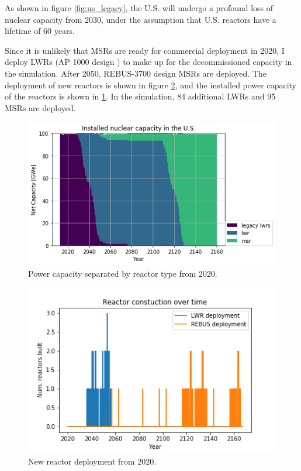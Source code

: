 As shown in figure \ref{fig:us_legacy}, the U.S. will
undergo a profound loss of nuclear capacity from 2030, under the
assumption that U.S. reactors have a lifetime of 60 years.

Since it is unlikely that \glspl{MSR} are ready for
commercial deployment in 2020, I deploy \glspl{LWR} (AP 1000 design \cite{sutharshan_ap1000tm_2011})
to make up for the decommissioned capacity in the simulation. After 2050,
REBUS-3700 design \glspl{MSR} are deployed. The deployment of new reactors
is shown in figure \ref{fig:us_dep}, and the installed
power capacity of the reactors is shown in \ref{fig:us_pow}.
In the simulation, 84 additional \glspl{LWR} and 95 \glspl{MSR}
are deployed.

\begin{figure}[htbp!]
	\begin{center}
		\includegraphics[scale=0.7]{./images/us/power_plot.png}
	\end{center}
	\caption{Power capacity separated by reactor type from 2020.}
	\label{fig:us_pow}
\end{figure}

\begin{figure}[htbp!]
	\begin{center}
		\includegraphics[scale=0.7]{./images/us/us_dep.png}
	\end{center}
	\caption{New reactor deployment from 2020.}
	\label{fig:us_dep}
\end{figure}


